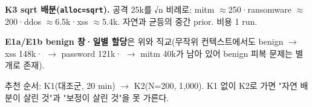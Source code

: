 \par\noindent \textbullet\enspace \textbf{K3 sqrt 배분(\texttt{alloc=\allowbreak{}\allowbreak{}sq\allowbreak{}rt}).} 공격 25k를 √n 비례로: mitm \ensuremath{\approx}250·ransomware \ensuremath{\approx}200·ddos \ensuremath{\approx}6.5k·xss \ensuremath{\approx}5.4k. 자연과 균등의 중간 prior. 비용 1 run.


\par\noindent \textbullet\enspace \textbf{E1a/\allowbreak{}E1b benign 창·일별 할당}은 위와 직교(무작위 컨텍스트에서도 benign \ensuremath{\rightarrow} xss 148k· \ensuremath{\rightarrow} password 121k· \ensuremath{\rightarrow} mitm 40k가 남아 있어 benign 피복 문제는 별개로 존재).


추천 순서: K1(대조군, 20 min)  \ensuremath{\rightarrow}  K2(N=\allowbreak{}200, 1,000). K1 없이 K2로 가면 "자연 배분이 살린 것"과 "보정이 살린 것"을 못 가른다.

